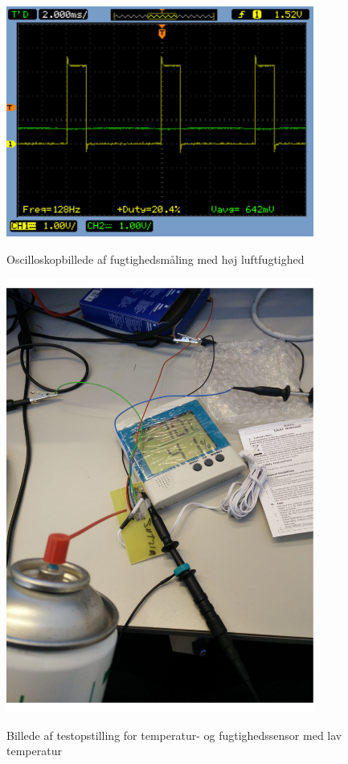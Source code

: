 \begin{figure}[H]
\centering
{\includegraphics[width=0.90\textwidth]{filer/modultest/Billeder/SCOP_tempKOLD}}
\caption{Oscilloskopbillede af fugtighedsmåling med høj luftfugtighed}
\label{lab:SCOP_TEMP_KOLD}
\end{figure}

\begin{figure}[H]
\centering
{\includegraphics[width=0.90\textwidth]{filer/modultest/Billeder/test_KOLD}}
\caption{Billede af testopstilling for temperatur- og fugtighedssensor med lav temperatur}
\label{lab:TEST_KOLD}
\end{figure}

